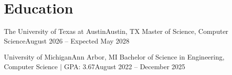 \section{Education}
\resumeSubHeadingListStart

    \resumeSubheading
    {The University of Texas at Austin}{Austin, TX}
    {Master of Science, Computer Science}{August 2026 -- Expected May 2028}

    \resumeBetweenEducationEntries

    \resumeSubheading
    {University of Michigan}{Ann Arbor, MI}
    {Bachelor of Science in Engineering, Computer Science $|$ GPA: 3.67}{August 2022 -- December 2025}
    \resumeItemListStart
    \resumeItemListEnd

\resumeSubHeadingListEnd
